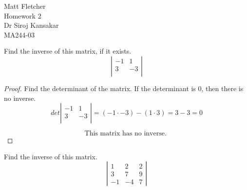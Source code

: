 \documentclass[8pt]{article}
\newenvironment{problem}[2][Problem]{\begin{trivlist}
\item[\hskip \labelsep {\bfseries #1}\hskip \labelsep {\bfseries #2.}]}{\end{trivlist}}
\begin{document}
 

 
\noindent Matt Fletcher
\\Homework 2
\\Dr Siroj Kansakar
\\MA244-03


%

 
\begin{problem}{12}
	Find the inverse of this matrix, if it exists. 
\[  \left| 
\begin{array}{ccc}
-1 & 1 \\
3 & -3  \\
\end{array} 
\right|\] 
\end{problem}
 
\begin{proof}
Find the determinant of the matrix. If the determinant is 0, then there is no inverse.
\[  det \left| 
\begin{array}{ccc}
-1 & 1 \\
3 & -3  \\
\end{array} 
\right| = (-1 \cdot -3) - (1 \cdot 3) = 3 - 3 = 0\]

\[\boxed{\text{This matrix has no inverse. }} \]


\end{proof}



\begin{problem}{14}
	Find the inverse of this matrix. 
\[  \left| 
\begin{array}{ccc}
1 & 2 & 2 \\
3 & 7 & 9 \\
-1 & -4 & 7 \end{array} 
\right|\] 

\end{problem}
\end{document}
